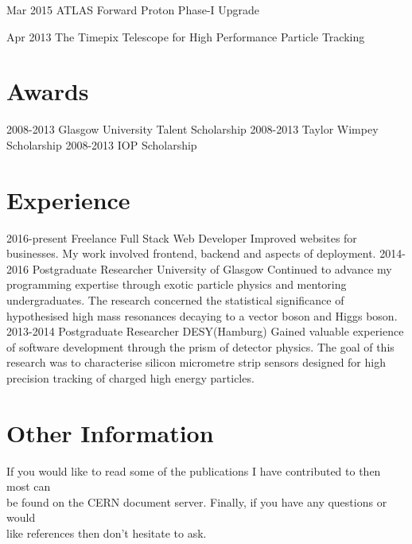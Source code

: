 \documentclass[]{twentysecondcv}
\begin{document}
\begin{twentyshort}
  \twentyitemshort
    {Mar 2015}
    {ATLAS Forward Proton Phase-I Upgrade }
\end{twentyshort}


\begin{twentyshort}
  \twentyitemshort
    {Apr 2013}
    {The Timepix Telescope for High Performance Particle Tracking }
\end{twentyshort}



\section*{Awards}

\begin{twentyshort}
  \twentyitemshort
    {2008-2013}
    {Glasgow University Talent Scholarship }
  \twentyitemshort
    {2008-2013}
    {Taylor Wimpey Scholarship }
  \twentyitemshort
    {2008-2013}
    {IOP Scholarship}
\end{twentyshort}


\section*{Experience}

\begin{twenty}
  \twentyitem
    {2016-present}
    {Freelance Full Stack Web Developer}
    {}
    {Improved websites for businesses. My work involved frontend, backend and aspects of deployment.}
  \twentyitem
    {2014-2016}
    {Postgraduate Researcher}
    {University of Glasgow}
    {Continued to advance my programming expertise through exotic particle physics and mentoring undergraduates.  The research concerned the  statistical significance of hypothesised high mass resonances decaying to a vector boson and Higgs boson.}
\twentyitem
    {2013-2014}
    {Postgraduate Researcher}
		{DESY(Hamburg)}
    {Gained valuable experience of software development through the prism of detector physics.  The goal of this research was to  characterise silicon micrometre strip sensors designed for high precision tracking of charged high energy particles.}

\end{twenty}
\section*{Other Information}
\hspace*{5pt}
If you would like to read some of the publications I have contributed to then most can \\ \hspace*{5pt} be found on the CERN document server. Finally, if you have any questions or would \\ \hspace*{5pt} like references then don't hesitate to ask. \\ 
\hspace*{5pt}
\vspace*{2pt}

\end{document}
